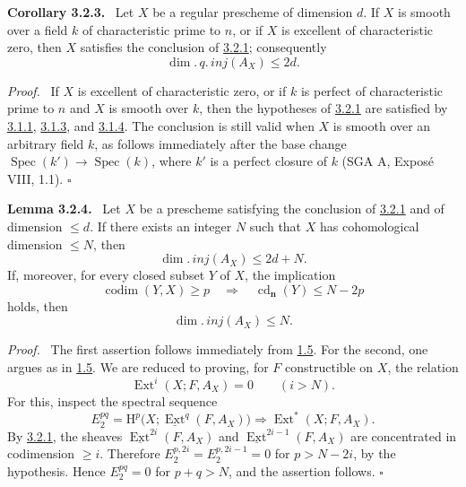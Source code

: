 \documentclass[11pt]{article}
\DeclareMathOperator{\codim}{codim}
\providecommand{\Hh}{\mathrm{H}}
\providecommand{\uExt}{\underline{\Ext}}
\providecommand{\qedtext}{\hfill$\square$}
\newenvironment{statement}[1]{\par\medskip\noindent\textbf{#1.}\ }{\par\medskip}
\newenvironment{prooftext}[1][Proof]{\par\noindent\emph{#1.}\ }{\par\medskip}
\DeclareMathOperator{\Ext}{Ext}
\DeclareMathOperator{\Spec}{Spec}
\DeclareMathOperator{\cd}{cd}
\providecommand{\Spec}{\operatorname{Spec}}
\providecommand{\Spec}{\operatorname{Spec}}
\providecommand{\Spec}{\operatorname{Spec}}
\providecommand{\qedtext}{\hfill$\square$}
\providecommand{\Spec}{\operatorname{Spec}}
\begin{document}
\label{sga5:I:corollary:3.2.3}\begin{statement}{Corollary 3.2.3}
Let $X$ be a regular prescheme of dimension $d$. If $X$ is smooth over a field $k$ of characteristic prime to $n$, or if $X$ is excellent of characteristic zero, then $X$ satisfies the conclusion of \hyperref[sga5:I:proposition:3.2.1]{3.2.1}; consequently
\[
   \dim.\,q.\,inj(A_X)\le 2d.
\]
\end{statement}

\begin{prooftext}
If $X$ is excellent of characteristic zero, or if $k$ is perfect of characteristic prime to $n$ and $X$ is smooth over $k$, then the hypotheses of \hyperref[sga5:I:proposition:3.2.1]{3.2.1} are satisfied by \hyperref[sga5:I:statement:3.1.1]{3.1.1}, \hyperref[sga5:I:statement:3.1.3]{3.1.3}, and \hyperref[sga5:I:statement:3.1.4]{3.1.4}. The conclusion is still valid when $X$ is smooth over an arbitrary field $k$, as follows immediately after the base change $\Spec(k')\to\Spec(k)$, where $k'$ is a perfect closure of $k$ (SGA A, Exposé VIII, 1.1). \qedtext
\end{prooftext}

\label{sga5:I:lemma:3.2.4}\begin{statement}{Lemma 3.2.4}
Let $X$ be a prescheme satisfying the conclusion of \hyperref[sga5:I:proposition:3.2.1]{3.2.1} and of dimension $\le d$. If there exists an integer $N$ such that $X$ has cohomological dimension $\le N$, then
\[
   \dim.\,inj(A_X)\le 2d+N.
\]
If, moreover, for every closed subset $Y$ of $X$, the implication
\[
   \codim(Y,X)\ge p \quad\Rightarrow\quad \cd_{\mathbf n}(Y)\le N-2p
\]
holds, then
\[
   \dim.\,inj(A_X)\le N.
\]
\end{statement}

\begin{prooftext}
The first assertion follows immediately from \hyperref[sga5:I:proposition:1.5]{1.5}. For the second, one argues as in \hyperref[sga5:I:proposition:1.5]{1.5}. We are reduced to proving, for $F$ constructible on $X$, the relation
\[
   \Ext^i(X;F,A_X)=0\qquad(i>N).
\]
For this, inspect the spectral sequence
\[
   E_2^{pq}=\Hh^p\bigl(X;\uExt^q(F,A_X)\bigr)
      \Rightarrow \Ext^*(X;F,A_X).
\]
By \hyperref[sga5:I:proposition:3.2.1]{3.2.1}, the sheaves $\uExt^{2i}(F,A_X)$ and $\uExt^{2i-1}(F,A_X)$ are concentrated in codimension $\ge i$. Therefore $E_2^{p,2i}=E_2^{p,2i-1}=0$ for $p>N-2i$, by the hypothesis. Hence $E_2^{pq}=0$ for $p+q>N$, and the assertion follows. \qedtext
\end{prooftext}
\end{document}
